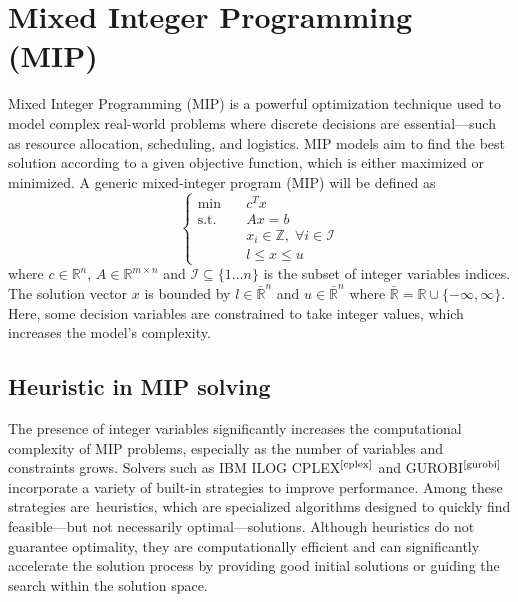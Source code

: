 \section{Mixed Integer Programming (MIP)}
Mixed Integer Programming (MIP) is a powerful optimization technique used to model complex real-world problems where discrete decisions are essential—such as resource allocation, scheduling, and logistics.
MIP models aim to find the best solution according to a given objective function, which is either maximized or minimized.
A generic mixed-integer program (MIP) will be defined as
\begin{equation}
\begin{cases}
\text{min} \quad & c^T x \\
\text{s.t.} \quad & Ax = b \\
                        & x_i \in \mathbb{Z},\; \forall i \in \mathcal{I} \\
                        & l \le x \le u
\end{cases}
\end{equation}
where $c \in \mathbb{R}^n$, $A \in \mathbb{R}^{m \times n}$ and $\mathcal{I}\subseteq\{1\dots n\}$ is the subset of integer variables indices. The solution vector $x$ is bounded by $l \in \bar{\mathbb{R}}^n$ and $u \in \bar{\mathbb{R}}^n$ where $\bar{\mathbb{R}}= \mathbb{R} \cup \{-\infty,\infty\}$.
Here, some decision variables are constrained to take integer values, which increases the model’s complexity.
\subsection{Heuristic in MIP solving}
The presence of integer variables significantly increases the computational complexity of MIP problems, especially as the number of variables and constraints grows. Solvers such as IBM ILOG CPLEX$^\text{\cite{cplex}}$ and GUROBI$^\text{\cite{gurobi}}$ incorporate a variety of built-in strategies to improve performance. Among these strategies are heuristics, which are specialized algorithms designed to quickly find feasible---but not necessarily optimal---solutions. Although heuristics do not guarantee optimality, they are computationally efficient and can significantly accelerate the solution 
process by providing good initial solutions or guiding the search within the solution space.


